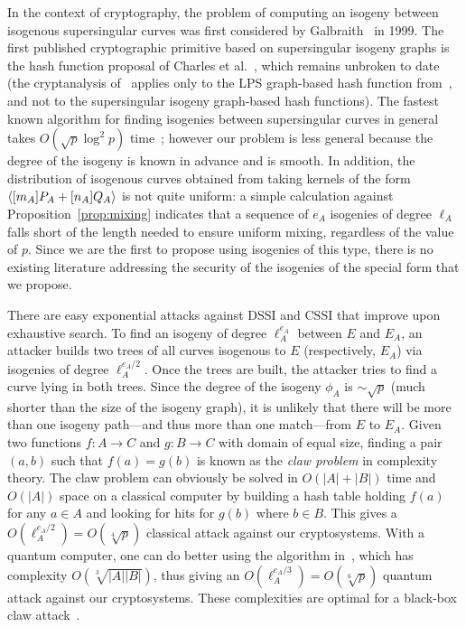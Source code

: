 In the context of cryptography, the problem of computing an isogeny
between isogenous supersingular curves was first considered by
Galbraith~\cite{Gal} in 1999. The first published cryptographic
primitive based on supersingular isogeny graphs is the hash function
proposal of Charles et al.~\cite{CGL}, which remains unbroken to date
(the cryptanalysis of~\cite{quis} applies only to the LPS graph-based
hash function from~\cite{CGL}, and not to the supersingular isogeny
graph-based hash functions). The fastest known algorithm for finding
isogenies between supersingular curves in general takes $O(\sqrt{p}
\log^2 p)$ time~\cite[\S 5.3.1]{CGL}; however our problem is less
general because the degree of the isogeny is known in advance and is
smooth. In addition, the distribution of isogenous
  curves obtained
from taking kernels of the form ${\langle [m_A]P_A+[n_A]Q_A \rangle}$ is not quite
uniform: a simple calculation against Proposition~\ref{prop:mixing}
indicates that a sequence of $e_A$ isogenies of degree $\ell_A$ falls
short of the length needed to ensure uniform mixing, regardless of the
value of $p$. Since we are the first to propose using isogenies of
this type, there is no existing literature addressing the security
of the isogenies of the special form that we propose.

There are easy exponential attacks against DSSI and CSSI that improve
upon exhaustive search. To find an isogeny of degree $\ell_A^{e_A}$
between $E$ and $E_A$, an attacker builds two trees of all curves
isogenous to $E$ (respectively, $E_A$) via isogenies of degree
$\ell_A^{e_A/2}$. Once the trees are built, the attacker tries to find
a curve lying in both trees. Since the degree of the isogeny $\phi_A$
is $\sim\sqrt{p}$ (much shorter than the size of the isogeny graph),
it is unlikely that there will be more than one isogeny path---and
thus more than one match---from $E$ to $E_A$. Given two functions
$f:A\to C$ and $g:B\to C$ with domain of equal size, finding a pair
$(a,b)$ such that $f(a)=g(b)$ is known as the \emph{claw problem} in
complexity theory. The claw problem can obviously be solved in $O(|A|
+ |B|)$ time and $O(|A|)$ space on a classical computer by building a
hash table holding $f(a)$ for any $a\in A$ and looking for hits for
$g(b)$ where $b\in B$. This gives a $O(\ell_A^{e_A/2})=O(\sqrt[4]{p})$
classical attack against our cryptosystems. With a quantum computer,
one can do better using the algorithm in~\cite{tani}, which has
complexity $O(\sqrt[3]{|A||B|})$, thus giving an
$O(\ell_A^{e_A/3})=O(\sqrt[6]{p})$ quantum attack against our
cryptosystems. These complexities are optimal for a black-box claw
attack~\cite{zhang}.

